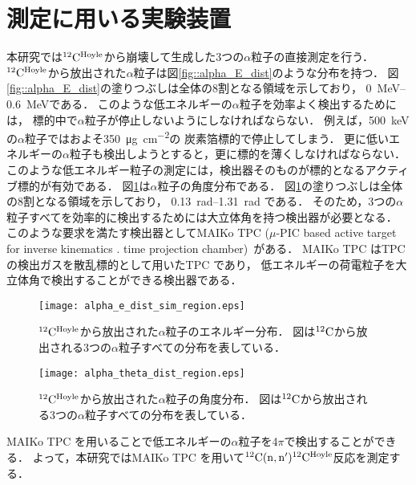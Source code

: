 \documentclass[../master]{subfiles}
\begin{document}
\section{測定に用いる実験装置}
\label{seq::detector_using_experiment}
本研究では${}^{12}{\rm C}^{\rm Hoyle}$から崩壊して生成した3つの$\alpha$粒子の直接測定を行う．
${}^{12}{\rm C}^{\rm Hoyle}$から放出された$\alpha$粒子は図\ref{fig::alpha_E_dist}のような分布を持つ．
図\ref{fig::alpha_E_dist}の塗りつぶしは全体の8割となる領域を示しており，
\SIrange{0}{0.6}{\mega\electronvolt}である．
このような低エネルギーの$\alpha$粒子を効率よく検出するためには，
標的中で$\alpha$粒子が停止しないようにしなければならない．
例えば，\SI{500}{\kilo\electronvolt}の$\alpha$粒子ではおよそ\SI{350}{\micro\gram\per\square\centi\metre}の
炭素箔標的で停止してしまう．
更に低いエネルギーの$\alpha$粒子も検出しようとすると，更に標的を薄くしなければならない．
このような低エネルギー粒子の測定には，検出器そのものが標的となるアクティブ標的が有効である．
図\ref{fig::alpha_theta_dist}は$\alpha$粒子の角度分布である．
図\ref{fig::alpha_theta_dist}の塗りつぶしは全体の8割となる領域を示しており，
\SIrange{0.13}{1.31}{\radian} である．
そのため，3つの$\alpha$粒子すべてを効率的に検出するためには大立体角を持つ検出器が必要となる．
このような要求を満たす検出器としてMAIKo TPC ($\mu$-PIC based active target for inverse kinematics .
time projection chamber)~\cite{maiko, mupic}がある．
MAIKo TPC はTPC の検出ガスを散乱標的として用いたTPC であり，
低エネルギーの荷電粒子を大立体角で検出することができる検出器である．
\begin{figure}
  \centering
  \texttt{[image: alpha\_e\_dist\_sim\_region.eps]}
  \caption[${}^{12}{\rm C}^{\rm Hoyle}$から放出された$\alpha$粒子のエネルギー分布．]
          {${}^{12}{\rm C}^{\rm Hoyle}$から放出された$\alpha$粒子のエネルギー分布．
            図は${}^{12}{\rm C}$から放出される3つの$\alpha$粒子すべての分布を表している．}
  \label{fig::alpha_E_dist}
  \texttt{[image: alpha\_theta\_dist\_region.eps]}
  \caption[${}^{12}{\rm C}^{\rm Hoyle}$から放出された$\alpha$粒子の角度分布．]
          {${}^{12}{\rm C}^{\rm Hoyle}$から放出された$\alpha$粒子の角度分布．
            図は${}^{12}{\rm C}$から放出される3つの$\alpha$粒子すべての分布を表している．
          }
  \label{fig::alpha_theta_dist}
\end{figure}
MAIKo TPC を用いることで低エネルギーの$\alpha$粒子を4$\pi$で検出することができる．
よって，本研究ではMAIKo TPC を用いて${}^{12}{\rm C}({\rm n},{\rm n}'){}^{12}{\rm C}^{\rm Hoyle}$反応を測定する．
\end{document}
